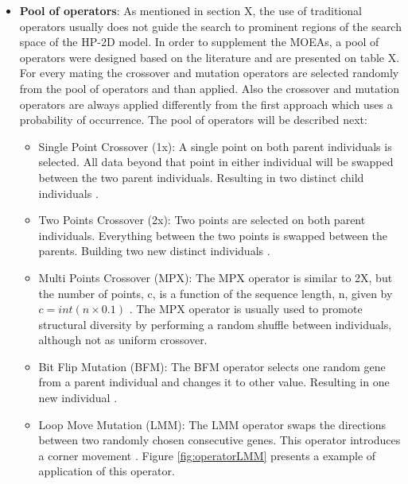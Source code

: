 \begin{itemize}
	\item \textbf{Pool of operators}:  As mentioned in section X, the use of traditional operators usually does not guide the search to prominent regions of the search space of the HP-2D model. In order to supplement the MOEAs, a pool of operators were designed based on the literature and are presented on table X.  For every mating the crossover and mutation operators are selected randomly from the pool of operators and than applied. Also the crossover and mutation operators are always applied differently from the first approach which uses a probability of occurrence. The pool of operators will be described next:
	
	\begin{itemize}
		\item Single Point Crossover (1x): A single point on both parent individuals is selected. All data beyond that point in either individual will be swapped between the two parent individuals. Resulting in two distinct child individuals \cite{holland1975adaptation}.
		
		\item Two Points Crossover (2x): Two points are selected on both parent individuals. Everything between the two points is swapped between the parents. Building two new distinct individuals \cite{holland1975adaptation}.
		
		\item Multi Points Crossover (MPX): The MPX operator is similar to 2X, but the number of points, c, is a function of the sequence length, n, given by $c = int(n \times 0.1)$ \cite{custodio2004investigation}. The MPX operator is usually used to promote structural diversity by performing a random shuffle between individuals, although not as uniform crossover.
		
		\item Bit Flip Mutation (BFM): The BFM operator selects one random gene from a parent individual and changes it to other value. Resulting in one new individual \cite{holland1975adaptation}.
		
		\item Loop Move Mutation (LMM): The LMM operator swaps the directions between two randomly chosen consecutive genes. This operator introduces a corner movement \cite{bazzoli2004memetic}. Figure \ref{fig:operatorLMM} presents a example of application of this operator.
		
		
		

\end{itemize}
\end{itemize}
